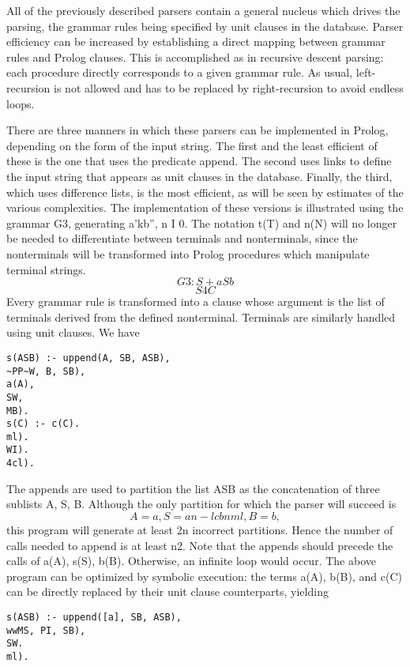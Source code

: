 
All of the previously described parsers contain a general nucleus which drives
the parsing, the grammar rules being specified by unit clauses in the database.
Parser efficiency can be increased by establishing a direct mapping between
grammar rules and Prolog clauses. This is accomplished as in recursive descent
parsing: each procedure directly corresponds to a given grammar rule. As usual,
left-recursion is not allowed and has to be replaced by right-recursion to avoid
endless loops. 

There are three manners in which these parsers can be implemented in Prolog,
depending on the form of the input string. The first and the least efficient of
these is the one that uses the predicate append. The second uses links to define
the input string that appears as unit clauses in the database. Finally, the third,
which uses difference lists, is the most efficient, as will be seen by estimates of
the various complexities. The implementation of these versions is illustrated
using the grammar G3, generating a’kb”, n I 0. The notation t(T) and n(N) will
no longer be needed to differentiate between terminals and nonterminals, since
the nonterminals will be transformed into Prolog procedures which manipulate
terminal strings. 
\[G3: S+aSb\]
\[S4C\]
Every grammar rule is transformed into a clause whose argument is the list of
terminals derived from the defined nonterminal. Terminals are similarly handled
using unit clauses. We have 
\begin{verbatim}
s(ASB) :- uppend(A, SB, ASB),
~PP~W, B, SB),
a(A),
SW,
MB).
s(C) :- c(C).
ml).
WI).
4cl).   
\end{verbatim}
The appends are used to partition the list ASB as the concatenation of three
sublists A, S, B. Although the only partition for which the parser will succeed is
\[A = a, S = an-lcbnml, B = b,\]
this program will generate at least 2n incorrect partitions. Hence the number of
calls needed to append is at least n2. Note that the appends should precede the
calls of a(A), s(S), b(B). Otherwise, an infinite loop would occur. The above
program can be optimized by symbolic execution: the terms a(A), b(B), and c(C)
can be directly replaced by their unit clause counterparts, yielding 
\begin{verbatim}
s(ASB) :- uppend([a], SB, ASB),
wwMS, PI, SB),
SW.
ml).  
\end{verbatim}


